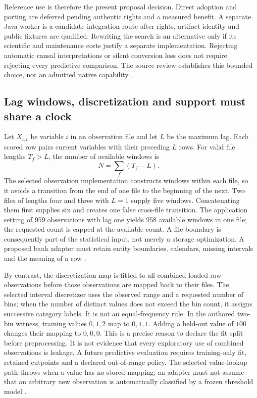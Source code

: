Reference use is therefore the present proposal decision. Direct adoption and
porting are deferred pending authentic rights and a measured benefit.
A separate Java worker is a candidate integration route after rights, artifact
identity and public fixtures are qualified. Rewriting the search is an
alternative only if its scientific and maintenance costs justify a separate
implementation. Rejecting automatic causal interpretations or silent
conversion loss does not require rejecting every predictive comparison.
The source review establishes this bounded choice, not an admitted native
capability \cite{exec24_banjo_choice}.

\subsection{Lag windows, discretization and support must share a clock}
Let $X_{i,t}$ be variable $i$ in an observation file and let $L$ be the maximum
lag. Each scored row pairs current variables with their preceding $L$ rows.
For valid file lengths $T_f>L$, the number of available windows is
\[
 N=\sum_f(T_f-L).
\]
The selected observation implementation constructs windows within each file,
so it avoids a transition from the end of one file to the beginning of the
next. Two files of lengths four and three with $L=1$ supply five windows.
Concatenating them first supplies six and creates one false cross-file
transition. The application setting of 959 observations with lag one yields
958 available windows in one file; the requested count is capped at the
available count. A file boundary is consequently part of the statistical
input, not merely a storage optimization. A proposed bank adapter must retain
entity boundaries, calendars, missing intervals and the meaning of a row
\cite{exec24_banjo_source,exec24_banjo_choice}.

By contrast, the discretization map is fitted to all combined loaded raw
observations before those observations are mapped back to their files.
The selected interval discretizer uses the observed range and a requested
number of bins; when the number of distinct values does not exceed the bin
count, it assigns successive category labels. It is not an equal-frequency
rule. In the authored two-bin witness, training values $0,1,2$ map to
$0,1,1$. Adding a held-out value of $100$ changes their mapping to $0,0,0$.
This is a precise reason to declare the fit split before preprocessing.
It is not evidence that every exploratory use of combined observations is
leakage. A future predictive evaluation requires training-only fit, retained
cutpoints and a declared out-of-range policy. The selected value-lookup path
throws when a value has no stored mapping; an adapter must not assume that
an arbitrary new observation is automatically classified by a frozen
threshold model \cite{exec24_banjo_source,exec24_banjo_choice}.

